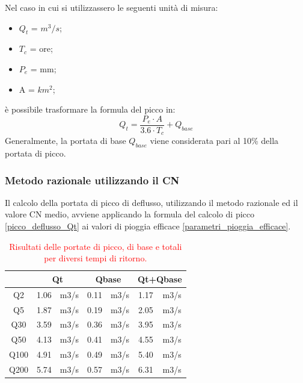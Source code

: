 Nel caso in cui si utilizzassero le seguenti unità di misura:
\begin{itemize}
    \item $Q_t$ = $m^3/s$;
    \item $T_c$ = ore;
    \item $P_e$ = mm;
    \item A = $km^2$;
\end{itemize}
è possibile trasformare la formula del picco in:
\begin{equation}
    Q_t = \frac{P_e \cdot A}{3.6 \cdot T_c} + Q_{base}
    \label{picco_deflusso_Qt}
\end{equation}
Generalmente, la portata di base $Q_{base}$ viene considerata pari al 10\% della portata di picco.

\subsubsection{Metodo razionale utilizzando il CN}
Il calcolo della portata di picco di deflusso, utilizzando il metodo razionale ed il valore CN medio, avviene applicando la formula del calcolo di picco \ref{picco_deflusso_Qt} ai valori di pioggia efficace \ref{parametri_pioggia_efficace}.

\begin{table}[H] \centering
    \caption{\textcolor{red}{Risultati delle portate di picco, di base e totali per diversi tempi di ritorno.}}
    \begin{tabular}{ccccccc}
    \toprule
         & \multicolumn{2}{c}{Qt} & \multicolumn{2}{c}{Qbase} & \multicolumn{2}{c}{Qt+Qbase} \\
    \midrule
    Q2   & 1.06       & m3/s      & 0.11        & m3/s        & 1.17          & m3/s         \\
    Q5   & 1.87       & m3/s      & 0.19        & m3/s        & 2.05          & m3/s         \\
    Q30  & 3.59       & m3/s      & 0.36        & m3/s        & 3.95          & m3/s         \\
    Q50  & 4.13       & m3/s      & 0.41        & m3/s        & 4.55          & m3/s         \\
    Q100 & 4.91       & m3/s      & 0.49        & m3/s        & 5.40          & m3/s         \\
    Q200 & 5.74       & m3/s      & 0.57        & m3/s        & 6.31          & m3/s  \\
    \bottomrule      
    \end{tabular}
    \end{table}

